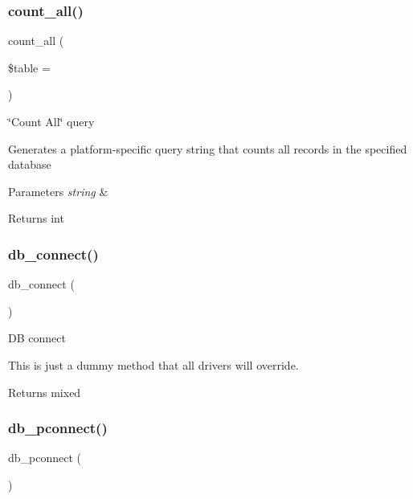 \subsubsection{\texorpdfstring{count\+\_\+all()}{count\_all()}}
{\footnotesize\ttfamily count\+\_\+all (\begin{DoxyParamCaption}\item[{}]{\$table = {\ttfamily \textquotesingle{}\textquotesingle{}} }\end{DoxyParamCaption})}

\char`\"{}\+Count All\char`\"{} query

Generates a platform-\/specific query string that counts all records in the specified database


\begin{DoxyParams}{Parameters}
{\em string} & \\
\hline
\end{DoxyParams}
\begin{DoxyReturn}{Returns}
int 
\end{DoxyReturn}
\mbox{\label{class_c_i___d_b__driver_a6aa545dcb7768f0b62d37cdcf7f09adc}} 
\subsubsection{\texorpdfstring{db\+\_\+connect()}{db\_connect()}}
{\footnotesize\ttfamily db\+\_\+connect (\begin{DoxyParamCaption}{ }\end{DoxyParamCaption})}

DB connect

This is just a dummy method that all drivers will override.

\begin{DoxyReturn}{Returns}
mixed 
\end{DoxyReturn}
\mbox{\label{class_c_i___d_b__driver_a0f69e662bd02de5bcf98647068e7c653}} 
\subsubsection{\texorpdfstring{db\+\_\+pconnect()}{db\_pconnect()}}
{\footnotesize\ttfamily db\+\_\+pconnect (\begin{DoxyParamCaption}{ }\end{DoxyParamCaption})}

